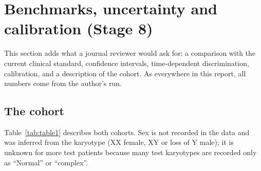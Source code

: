 \documentclass[11pt,a4paper]{article}
\begin{document}
\section{Benchmarks, uncertainty and calibration (Stage 8)}
\label{sec:stage8}
This section adds what a journal reviewer would ask for: a comparison with the current
clinical standard, confidence intervals, time-dependent discrimination, calibration, and
a description of the cohort. As everywhere in this report, all numbers come from the author's run.

\subsection{The cohort}
Table~\ref{tab:table1} describes both cohorts. Sex is not recorded in the data and was
inferred from the karyotype (XX female, XY or loss of Y male); it is unknown for more
test patients because many test karyotypes are recorded only as ``Normal'' or ``complex''.
\end{document}
